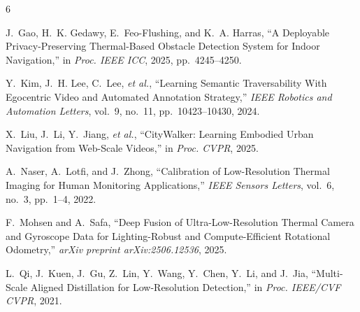 \documentclass[conference,a4paper]{IEEEtran}
\begin{document}
%
%
%
\begin{thebibliography}{6}

J.~Gao, H.~K. Gedawy, E.~Feo-Flushing, and K.~A. Harras, ``A Deployable
  Privacy-Preserving Thermal-Based Obstacle Detection System for Indoor
  Navigation,'' in \emph{Proc. IEEE ICC}, 2025, pp.~4245--4250.

Y.~Kim, J.~H. Lee, C.~Lee, \emph{et al.}, ``Learning Semantic
  Traversability With Egocentric Video and Automated Annotation
  Strategy,'' \emph{IEEE Robotics and Automation Letters}, vol.~9, no.~11,
  pp.~10423--10430, 2024.

X.~Liu, J.~Li, Y.~Jiang, \emph{et al.}, ``CityWalker: Learning Embodied
  Urban Navigation from Web-Scale Videos,'' in \emph{Proc. CVPR}, 2025.

A.~Naser, A.~Lotfi, and J.~Zhong, ``Calibration of Low-Resolution Thermal
  Imaging for Human Monitoring Applications,'' \emph{IEEE Sensors
  Letters}, vol.~6, no.~3, pp.~1--4, 2022.

F.~Mohsen and A.~Safa, ``Deep Fusion of Ultra-Low-Resolution Thermal
  Camera and Gyroscope Data for Lighting-Robust and Compute-Efficient
  Rotational Odometry,'' \emph{arXiv preprint arXiv:2506.12536}, 2025.

L.~Qi, J.~Kuen, J.~Gu, Z.~Lin, Y.~Wang, Y.~Chen, Y.~Li, and J.~Jia,
  ``Multi-Scale Aligned Distillation for Low-Resolution Detection,'' in
  \emph{Proc. IEEE/CVF CVPR}, 2021.

\end{thebibliography}




\end{document}

